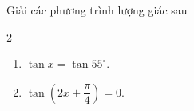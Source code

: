 \begin{bt}%
	Giải các phương trình lượng giác sau
	\begin{multicols}{2}
		\begin{enumerate}
			\item $\tan x=\tan 55^{\circ}$.
			\item $\tan \left(2 x+\dfrac{\pi}{4}\right)=0$.
		\end{enumerate}
	\end{multicols}
\end{bt}

